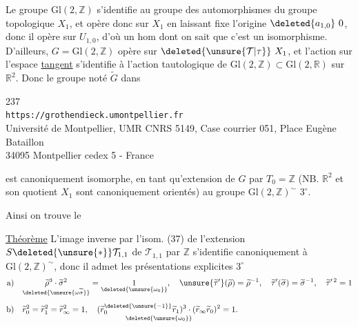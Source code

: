 Le groupe $\mathrm{Gl}(2,\mathbb Z)$ s'identifie au groupe des automorphismes du groupe topologique $X_1$, et opère donc sur $X_1$ en laissant fixe l'origine $\deleted{a_{1,0}}\ 0$, donc il opère sur $U_{1,0}$, d'où un hom
dont on sait que c'est un isomorphisme. D'ailleurs, $G=\mathrm{Gl}(2,\mathbb Z)$ opère  sur $\deleted{\unsure{\mathcal T|\tau}}\ X_1$, et l'action sur l'espace \uline{tangent} s'identifie à l'action tautologique de $\mathrm{Gl}(2,\mathbb Z)\subset\mathrm{Gl}(2,\mathbb R)$ sur $\mathbb R^2$. Donc le groupe noté $\widetilde G$ dans


\begin{center}
237\\
\texttt{https://grothendieck.umontpellier.fr}\\
Université de Montpellier, UMR CNRS 5149, Case courrier 051, Place Eugène Bataillon\\
34095 Montpellier cedex 5 - France
\end{center}


  est canoniquement isomorphe, en tant qu'extension de $G$ par $T_0=\mathbb Z$ (NB. $\mathbb R^2$ et son quotient $X_1$ sont canoniquement orientés) au groupe $\mathrm{Gl}(2,\mathbb Z)^\sim$  $3^\circ$.

Ainsi on trouve   le

\uline{Théorème} L'image inverse par l'isom. (37) de l'extension $S\deleted{\unsure{*}}\mathcal T_{1,1}$ de $\mathcal T_{1,1}$ par $\mathbb Z$ s'identifie canoniquement à $\mathrm{Gl}(2,\mathbb Z)^\sim$, donc il admet les  présentations explicites  $3^\circ$
\[
\begin{aligned}
\text{a)}\quad &
\underset{\deleted{\unsure{\omega\widetilde\sigma}}}{\widetilde\rho^{3}\cdot\widetilde\sigma^{2}}
=\underset{\deleted{\unsure{\omega_0}}}{1},\quad
\unsure{\widetilde\tau'}(\widetilde\rho)=\widetilde\rho^{-1},\quad
\widetilde\tau'(\widetilde\sigma)=\widetilde\sigma^{-1},\quad
\widetilde\tau'^{\,2}=1
\\[1ex]
\text{b)}\quad &
\widetilde r_0^{2}=\widetilde r_1^{2}=\widetilde r_\infty^{2}=1,\quad
\underset{\deleted{\unsure{\omega_0}}}{
(\widetilde r_0^{\deleted{\unsure{-1}}}\widetilde r_1)^3\cdot
(\widetilde r_\infty\widetilde r_0)^2}=1.
\end{aligned}
\]

